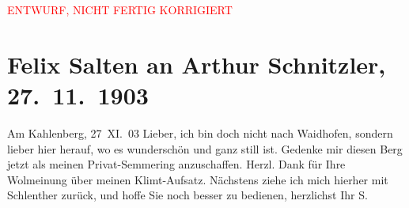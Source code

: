 
\begin{center}
            \textcolor{red}{ENTWURF, NICHT FERTIG KORRIGIERT}
                      \end{center}
            
         
         \renewcommand{\erwaehntePersonen}{Personen: Gustav Klimt, Paul Schlenther}
         \renewcommand{\erwaehnteOrte}{Orte: Kahlenberg, Semmering, Waidhofen an der Ybbs, Wien}
         \renewcommand{\erwaehnteWerke}{Werke: Gustav Klimt. Gelegentliche Anmerkungen}
               \section[Felix Salten an Arthur Schnitzler, 27. 11. 1903]{ Felix Salten an Arthur Schnitzler, 27. 11. 1903}\nopagebreak{}\rehead{ }\begin{ledgroupsized}[t]{13cm}\normalsize\beginnumbering \toendnotes[C]{\smallbreak\pagebreak[2]} 
\toendnotes[C]{\smallbreak}\pstart
           \raggedleft{}{\pb}Am Kahlenberg, 27 XI. 03\pend
           \pstart
           Lieber, ich bin doch nicht nach Waidhofen,
      sondern lieber hier herauf, wo es wunderschön
      und ganz still ist. Gedenke mir diesen Berg
      jetzt als meinen Privat-Semmering
      anzuschaffen. Herzl. Dank für
      Ihre Wolmeinung über meinen Klimt-Aufsatz. Nächstens ziehe ich mich
               hierher mit Schlenther zurück, und
      hoffe Sie noch besser zu bedienen,
      \pend
           \pstart herzlichst Ihr \spacefill\mbox{S.}\pend{}
         
         \endnumbering{}\end{ledgroupsized}\begin{anhang}\end{anhang}\newcommand{\dateiname}{L03352}\newcommand{\titel}{Felix Salten an Arthur Schnitzler, 27. 11. 1903}\newcommand{\editorInnen}{Martin Anton Müller und Laura Untner}
      